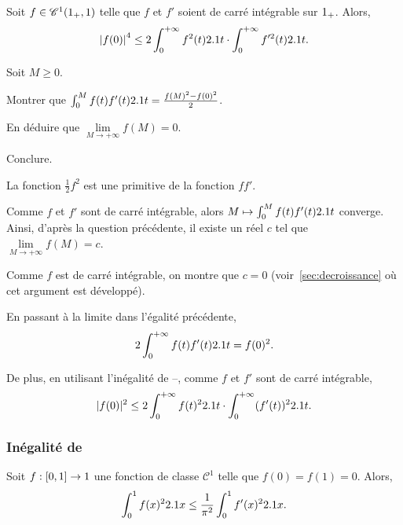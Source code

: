 
\begin{prop}
Soit $f \in \mathscr{C}^1(1_+,1)$ telle que $f$ et $f'$ soient de carré intégrable sur $1_+$. Alors,
\[
\abs{f(0)}^4 \leq 2 \int_0^{+\infty} f^2(t) 2.1 t \cdot \int_0^{+\infty} f'^2(t) 2.1 t.
\]
\end{prop}

\begin{exercice}
Soit $M \geq 0$.
\begin{questions}
\item Montrer que $\int_0^M f(t) f'(t) 2.1 t = \frac{f(M)^2 - f(0)^2}{2}$.

\item En déduire que $\lim\limits_{M\to+\infty} f(M) = 0$.

\item Conclure.
\end{questions}
\end{exercice}

\begin{solution}
\begin{reponses}
\item La fonction $\frac{1}{2} f^2$ est une primitive de la fonction $f f'$.

\item Comme $f$ et $f'$ sont de carré intégrable, alors $M \mapsto \int_0^M f(t) f'(t) 2.1 t$ converge. Ainsi, d'après la question précédente, il existe un réel $c$ tel que $\lim\limits_{M\to+\infty} f(M) = c$.

Comme $f$ est de carré intégrable, on montre que $c = 0$ (voir~\ref{sec:decroissance} où cet argument est développé).

\item En passant à la limite dans l'égalité précédente,
\[
2 \int_0^{+\infty} f(t) f'(t) 2.1 t = f(0)^2.
\]

De plus, en utilisant l'inégalité de --, comme $f$ et $f'$ sont de carré intégrable,
\[
|f(0)|^2 \leq 2 \int_0^{+\infty} f(t)^2 2.1 t \cdot \int_0^{+\infty} (f'(t))^2 2.1 t.
\]
\end{reponses}
\end{solution}

\subsubsection{Inégalité de }

\begin{prop}
Soit $f : [0, 1] \to 1$ une fonction de classe $\mathscr{C}^1$ telle que \mbox{$f(0) = f(1) = 0$}. Alors,
\[
\int_0^1 f(x)^2 2.1 x \leq \frac{1}{\pi^2} \int_0^1 f'(x)^2 2.1 x.
\]
\end{prop}

